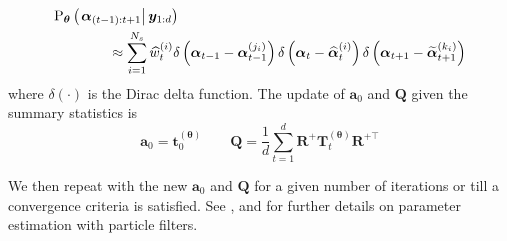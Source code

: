 \documentclass[9pt, notitlepage]{article}
\renewcommand{\vec}[1]{\bm{#1}}
\newcommand{\mat}[1]{\mathbf{#1}}
\newcommand{\Lparen}[1]{\left( #1\right)}
\newcommand{\Cond}[2]{\left. #1 \vphantom{#2} \right\vert  #2}
\newcommand{\Prob}{\text{P}}
\newcommand{\optor}[2]{#1\Lparen{#2}}
\newcommand{\optorC}[3]{\optor{#1}{\Cond{#2}{#3}}}
\newcommand{\dirac}[1]{\optor{\delta}{#1}}
\newcommand{\partic}[3]{#1_{#2}^{\Lparen{#3}}}
\newcommand{\particB}[3]{\widetilde{#1}_{#2}^{\Lparen{#3}}}
\newcommand{\particS}[3]{\widehat{#1}_{#2}^{\Lparen{#3}}}
\newcommand{\nPart}{N}
\newcommand{\nPeriods}{d}
\begin{document}
%
\begin{equation}\begin{split}
\optorC{\Prob_{\vec{\theta}}}{\vec{\alpha}_{(t-1):{t+1}}}{\vec{y}_{1:\nPeriods}} \hspace{-50pt} & \\
%
	& \approx \sum_{i=1}^{\nPart_s}\particS{w}{t}{i}
		\dirac{\vec{\alpha}_{t - 1} - \partic{\vec{\alpha}}{t-1}{j_i}}
		\dirac{\vec{\alpha}_{t} - \particS{\vec{\alpha}}{t}{i}}
		\dirac{\vec{\alpha}_{t + 1} - \particB{\vec{\alpha}}{t + 1}{k_i}}
\end{split}\end{equation} %
%
%
where $\dirac{\cdot}$ is the Dirac delta function. The update of $\vec{a}_0$ and $\mat{Q}$ given the summary statistics is%
%
\begin{equation}
\vec{a}_0 = \vec{t}_0^{(\vec{\theta})} \qquad
%
\mat{Q} = \frac{1}{\nPeriods}\sum_{t = 1}^\nPeriods \mat{R}^+\vec{T}_t^{(\vec{\theta})}\mat{R}^{+\top}
\end{equation}%

We then repeat with the new $\vec{a}_0$ and $\mat{Q}$ for a given number of iterations or till a convergence criteria is satisfied.  See \cite{kantas15}, \cite{del10} and \cite{schon11} for further details on parameter estimation with particle filters.
\end{document}
